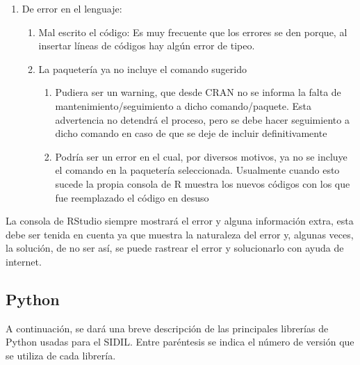 \documentclass[
]{article}
\begin{document}
\begin{enumerate}
\def\labelenumi{\arabic{enumi})}
\setcounter{enumi}{2}
\item
  De error en el lenguaje:

  \begin{enumerate}
  \def\labelenumii{\roman{enumii}.}
  \item
    Mal escrito el código: Es muy frecuente que los errores se den porque, al insertar líneas de códigos hay algún error de tipeo.
  \item
    La paquetería ya no incluye el comando sugerido

    \begin{enumerate}
    \def\labelenumiii{\arabic{enumiii}.}
    \item
      Pudiera ser un warning, que desde CRAN no se informa la falta de mantenimiento/seguimiento a dicho comando/paquete. Esta advertencia no detendrá el proceso, pero se debe hacer seguimiento a dicho comando en caso de que se deje de incluir definitivamente
    \item
      Podría ser un error en el cual, por diversos motivos, ya no se incluye el comando en la paquetería seleccionada. Usualmente cuando esto sucede la propia consola de R muestra los nuevos códigos con los que fue reemplazado el código en desuso
    \end{enumerate}
  \end{enumerate}
\end{enumerate}

La consola de RStudio siempre mostrará el error y alguna información extra, esta debe ser tenida en cuenta ya que muestra la naturaleza del error y, algunas veces, la solución, de no ser así, se puede rastrear el error y solucionarlo con ayuda de internet.

\hypertarget{python}{%
\subsection{Python}\label{python}}

A continuación, se dará una breve descripción de las principales librerías de Python usadas para el SIDIL. Entre paréntesis se indica el número de versión que se utiliza de cada librería.
\end{document}
